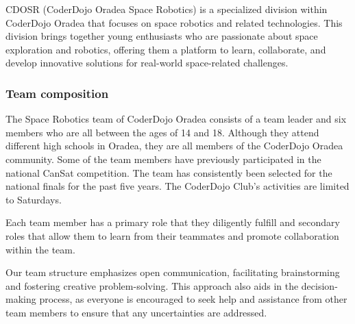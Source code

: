 \documentclass[11pt]{article}
\begin{document}
CDOSR (CoderDojo Oradea Space Robotics) is a specialized division within CoderDojo Oradea that focuses on space robotics and related technologies. This division brings together young enthusiasts who are passionate about space exploration and robotics, offering them a platform to learn, collaborate, and develop innovative solutions for real-world space-related challenges.

\subsubsection{Team composition}

The Space Robotics team of CoderDojo Oradea consists of a team leader and six members who are all between the ages of 14 and 18. Although they attend different high schools in Oradea, they are all members of the CoderDojo Oradea community. Some of the team members have previously participated in the national CanSat competition. The team has consistently been selected for the national finals for the past five years. The CoderDojo Club's activities are limited to Saturdays.

Each team member has a primary role that they diligently fulfill and secondary roles that allow them to learn from their teammates and promote collaboration within the team.

Our team structure emphasizes open communication, facilitating brainstorming and fostering creative problem-solving. This approach also aids in the decision-making process, as everyone is encouraged to seek help and assistance from other team members to ensure that any uncertainties are addressed.
\end{document}
